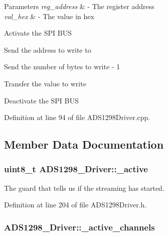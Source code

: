 \begin{DoxyParams}{\-Parameters}
{\em reg\-\_\-address} & -\/ \-The register address \\
\hline
{\em val\-\_\-hex} & -\/ \-The value in hex \\
\hline
\end{DoxyParams}
\-Activate the \-S\-P\-I \-B\-U\-S

\-Send the address to write to

\-Send the number of bytes to write -\/ 1

\-Transfer the value to write

\-Deactivate the \-S\-P\-I \-B\-U\-S 

\-Definition at line 94 of file \-A\-D\-S1298\-Driver.\-cpp.



\subsection{\-Member \-Data \-Documentation}
\hypertarget{class_a_d_s1298___driver_a957aac836bd2d6506a971bcb72cf6de7}{
\subsubsection[{\-\_\-active}]{\setlength{\rightskip}{0pt plus 5cm}uint8\-\_\-t {\bf \-A\-D\-S1298\-\_\-\-Driver\-::\-\_\-active}}}\label{class_a_d_s1298___driver_a957aac836bd2d6506a971bcb72cf6de7}


\-The guard that tells us if the streaming has started. 



\-Definition at line 204 of file \-A\-D\-S1298\-Driver.\-h.

\hypertarget{class_a_d_s1298___driver_ab8a50f10e853ff7cc5a79ac92f724345}{
\subsubsection[{\-\_\-active\-\_\-channels}]{ {\bf \-A\-D\-S1298\-\_\-\-Driver\-::\-\_\-active\-\_\-channels}}}\label{class_a_d_s1298___driver_ab8a50f10e853ff7cc5a79ac92f724345}


